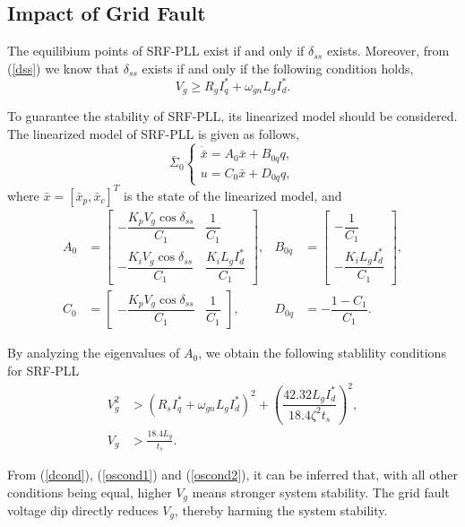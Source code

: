 \documentclass[10pt,final,journal,twoside]{IEEEtran}
\begin{document}
\subsection{Impact of Grid Fault}
The equilibium points of SRF-PLL exist if and only if $\delta_{ss}$ exists. Moreover, from (\ref{dss}) we know that $\delta_{ss}$ exists if and only if the following condition holds,
\begin{equation}\label{dcond}V_g\geqslant R_gI_q^*+\omega_{gn}L_gI_d^*.\end{equation}

To guarantee the stability of SRF-PLL, its linearized model should be considered. The linearized model of SRF-PLL is given as follows,
\begin{equation}\label{lclSRFPLL}
\bar{\Sigma}_{0}\begin{cases}
    \dot{\bar{x}}=A_{0}\bar{x}+B_{0q}q,\\
    u=C_{0}\bar{x}+D_{0q}q,
\end{cases}
\end{equation}
where $\bar{x}=[\bar{x}_p,\bar{x}_c]^T$ is the state of the linearized model, and
\begin{align*}
A_{0}&=\begin{bmatrix}
    -\dfrac{K_pV_g\cos\delta_{ss}}{C_1}&\dfrac{1}{C_1}\\-\dfrac{K_iV_g\cos\delta_{ss}}{C_1}&\dfrac{K_iL_gI_d^*}{C_1}
\end{bmatrix},&B_{0q}&=\begin{bmatrix}
    -\dfrac{1}{C_1}\\-\dfrac{K_iL_gI_d^*}{C_1}
\end{bmatrix},\\
C_{0}&=\begin{bmatrix}
    -\dfrac{K_pV_g\cos\delta_{ss}}{C_1}&\dfrac{1}{C_1}
\end{bmatrix},&D_{0q}&=-\dfrac{1-C_1}{C_1}.
\end{align*}\par
By analyzing the eigenvalues of $A_{0}$, we obtain the following stablility conditions for SRF-PLL
\begin{align}
    V_g^2&>\left(R_sI_q^*+\omega_{gn}L_gI_d^*\right)^2+\left(\dfrac{42.32L_gI_d^*}{18.4\zeta^2t_s}\right)^2,\label{oscond1}\\
    V_g&>\frac{18.4L_g}{t_s}.\label{oscond2}
\end{align}\par
From (\ref{dcond}), (\ref{oscond1}) and (\ref{oscond2}), it can be inferred that, with all other conditions being equal, higher $V_g$ means stronger system stability. The grid fault voltage dip
directly reduces $V_g$, thereby harming the system stability.
\end{document}
